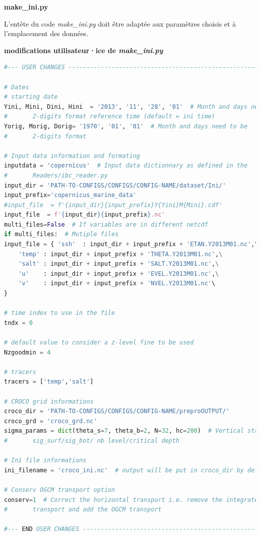 \documentclass[10pt,a4paper,titlepage]{article}
\begin{document}
\textbf{make\_ini.py}

L'entête du code \textit{make\_ini.py} doit être adaptée aux paramètres choisis et à l'emplacement des données.

\begin{codeEnv}{\textbf{modifications utilisateur·ice de \textit{make\_ini.py}}}
\begin{lstlisting}[language=python]
#--- USER CHANGES ---------------------------------------------------------

# Dates
# starting date
Yini, Mini, Dini, Hini  = '2013', '11', '28', '01'  # Month and days need to be
#       2-digits format reference time (default = ini time)
Yorig, Morig, Dorig= '1970', '01', '01'  # Month and days need to be
#       2-digits format

# Input data information and formating
inputdata = 'copernicus'  # Input data dictionnary as defined in the
#       Readers/ibc_reader.py
input_dir = 'PATH-TO-CONFIGS/CONFIGS/CONFIG-NAME/dataset/Ini/'
input_prefix='copernicus_marine_data'
#input_file  = f'{input_dir}{input_prefix}Y{Yini}M{Mini}.cdf'
input_file  = f'{input_dir}{input_prefix}.nc'
multi_files=False  # If variables are in different netcdf
if multi_files:  # Mutiple files
input_file = { 'ssh'  : input_dir + input_prefix + 'ETAN.Y2013M01.nc',\
    'temp' : input_dir + input_prefix + 'THETA.Y2013M01.nc',\
    'salt' : input_dir + input_prefix + 'SALT.Y2013M01.nc',\
    'u'    : input_dir + input_prefix + 'EVEL.Y2013M01.nc',\
    'v'    : input_dir + input_prefix + 'NVEL.Y2013M01.nc'\
}

# time index to use in the file
tndx = 0

# default value to consider a z-level fine to be used
Nzgoodmin = 4

# tracers
tracers = ['temp','salt']

# CROCO grid informations
croco_dir = 'PATH-TO-CONFIGS/CONFIGS/CONFIG-NAME/preproOUTPUT/'
croco_grd = 'croco_grd.nc'
sigma_params = dict(theta_s=7, theta_b=2, N=32, hc=200)  # Vertical streching,
#       sig_surf/sig_bot/ nb level/critical depth

# Ini file informations
ini_filename = 'croco_ini.nc'  # output will be put in croco_dir by default

# Conserv OGCM transport option
conserv=1  # Correct the horizontal transport i.e. remove the integrated
#       transport and add the OGCM transport

#--- END USER CHANGES -----------------------------------------------------

\end{lstlisting}
\end{codeEnv}
\end{document}
